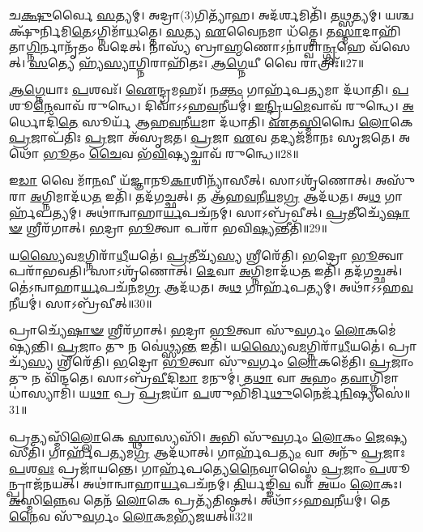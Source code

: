 𑌚\-\ul{𑌕𑍍𑌷𑍁}\-𑌰𑍍𑌵𑍈 \ul{𑌸}\-𑌤𑍍𑌯𑌮𑍍।
𑌅𑌦𑍍𑌰𑌾(3)𑌗𑌿𑌤𑍍𑌯𑌾᳴𑌹।
𑌅𑌦᳴𑌰𑍍\mbox{}\-\ul{𑌶}\-𑌮𑌿𑌤𑌿᳴।
𑌤\-\ul{𑌥𑍍𑌸}\-𑌤𑍍𑌯𑌮𑍍।
𑌯𑌶𑍍𑌚𑌕𑍍𑌷𑍁᳴𑌰𑍍𑌨𑌿𑌮𑌿\-\ul{𑌤𑍇}\-\-𑌽𑌗𑍍𑌨𑌿𑌮𑌾᳴\-\ul{𑌧}\-𑌤𑍍𑌤𑍇।
\-\ul{𑌸}\-𑌤𑍍𑌯 \ul{𑌏}\-𑌵𑍈\-\ul{𑌨}\-𑌮𑌾 𑌧᳴𑌤𑍍𑌤𑍇।
𑌤\-\ul{𑌸𑍍𑌮𑌾}\-𑌦𑌾𑌹𑌿᳴𑌤𑌾\-\ul{𑌗𑍍𑌨𑌿}\-𑌰𑍍𑌨𑌾𑌨𑍃᳴𑌤𑌂 𑌵𑌦𑍇𑌤𑍍।
𑌨𑌾𑌸𑍍𑌯᳴ 𑌬𑍍𑌰𑌾\-\ul{𑌹𑍍𑌮}\-𑌣𑍋\-𑌽𑌨𑌾॑𑌶𑍍𑌵𑌾\-\ul{𑌨𑍍𑌗𑍃}\-𑌹𑍇 𑌵᳴𑌸𑍇𑌤𑍍।
\-\ul{𑌸}\-𑌤𑍍𑌯𑍇 𑌹𑍍𑌯᳴\-\ul{𑌸𑍍𑌯𑌾}\-𑌗𑍍𑌨𑌿𑌰𑌾𑌹𑌿᳴𑌤𑌃।
\-\ul{𑌆}\-\-\ul{𑌗𑍍𑌨𑍇}\-𑌯𑍀 𑌵𑍈 𑌰𑌾𑌤𑍍𑌰𑌿𑌃᳴॥27॥

\-\ul{𑌆}\-\-\ul{𑌗𑍍𑌨𑍇}\-𑌯𑌾𑌃 \ul{𑌪}\-𑌶𑌵𑌃᳴।
\-\ul{𑌐}\-𑌨𑍍𑌦𑍍𑌰𑌮𑌹𑌃᳴।
𑌨\-\ul{𑌕𑍍𑌤𑌂} 𑌗𑌾𑌰𑍍\mbox{}𑌹᳴𑌪\-\ul{𑌤𑍍𑌯}\-𑌮𑌾 𑌦᳴𑌧𑌾𑌤𑌿।
\-\ul{𑌪}\-𑌶𑍂\-\ul{𑌨𑍇}\-𑌵𑌾𑌵᳴ 𑌰𑍁𑌨𑍍𑌧𑍇।
𑌦𑌿𑌵𑌾᳴𑌽𑌽𑌹\-\ul{𑌵}\-𑌨𑍀𑌯𑌮𑍍॑।
\-\ul{𑌇}\-\-\ul{𑌨𑍍𑌦𑍍𑌰𑌿}\-𑌯\-\ul{𑌮𑍇}\-𑌵𑌾𑌵᳴ 𑌰𑍁𑌨𑍍𑌧𑍇।
\-\ul{𑌅}\-𑌰𑍍𑌧𑍋𑌦𑌿᳴\-\ul{𑌤𑍇} 𑌸𑍂𑌰𑍍𑌯᳴ 𑌆𑌹\-\ul{𑌵}\-𑌨𑍀\-\ul{𑌯}\-𑌮𑌾 𑌦᳴𑌧𑌾𑌤𑌿।
\-\ul{𑌏}\-𑌤\-\ul{𑌸𑍍𑌮𑌿}\-𑌨𑍍𑌵𑍈 \ul{𑌲𑍋}\-𑌕𑍇 \ul{𑌪𑍍𑌰}\-𑌜𑌾\-𑌪᳴𑌤𑌿𑌃 \ul{𑌪𑍍𑌰}\-𑌜𑌾 𑌅᳴\-𑌸𑍃𑌜𑌤।
\-\ul{𑌪𑍍𑌰}\-𑌜𑌾 \ul{𑌏}\-𑌵 𑌤𑌦𑍍𑌯𑌜᳴𑌮𑌾𑌨𑌃 𑌸𑍃𑌜𑌤𑍇।
𑌅𑌥𑍋᳴ \ul{𑌭𑍂}\-𑌤𑌂 \ul{𑌚𑍈}\-𑌵 𑌭᳴\-\ul{𑌵𑌿}\-𑌷𑍍𑌯𑌚𑍍𑌚𑌾𑌵᳴ 𑌰𑍁𑌨𑍍𑌧𑍇॥28॥

𑌇\-\ul{𑌡𑌾} 𑌵𑍈 𑌮𑌾᳴\-\ul{𑌨}\-𑌵𑍀 𑌯᳴𑌜𑍍𑌞𑌾𑌨𑍂\-\ul{𑌕𑌾}\-𑌶𑌿𑌨𑍍𑌯𑌾᳴𑌸𑍀𑌤𑍍।
𑌸𑌾𑌽𑌶𑍃᳴𑌣𑍋𑌤𑍍।
𑌅𑌸𑍁᳴𑌰𑌾 \ul{𑌅}\-𑌗𑍍𑌨𑌿𑌮𑌾𑌦᳴𑌧\-\ul{𑌤} 𑌇𑌤𑌿᳴।
𑌤𑌦᳴𑌗𑌚𑍍𑌛𑌤𑍍।
𑌤 𑌆᳴𑌹\-\ul{𑌵}\-𑌨𑍀\-\ul{𑌯}\-𑌮\-\ul{𑌗𑍍𑌰} 𑌆𑌦᳴𑌧𑌤।
𑌅\-\ul{𑌥} 𑌗𑌾𑌰𑍍\mbox{}𑌹᳴𑌪𑌤𑍍𑌯𑌮𑍍।
𑌅𑌥𑌾॑𑌨𑍍𑌵𑌾𑌹𑌾\-\ul{𑌰𑍍𑌯}\-𑌪𑌚᳴𑌨𑌮𑍍।
𑌸𑌾𑌽𑌬𑍍𑌰᳴𑌵𑍀𑌤𑍍।
\-\ul{𑌪𑍍𑌰}\-𑌤𑍀𑌚𑍍𑌯𑍇᳴\-\ul{𑌷𑌾}\-\-\ul{𑍟} 𑌶𑍍𑌰𑍀𑌰᳴𑌗𑌾𑌤𑍍।
\-\ul{𑌭}\-𑌦𑍍𑌰𑌾 \ul{𑌭𑍂}\-𑌤𑍍𑌵𑌾 𑌪𑌰𑌾᳴ 𑌭𑌵𑌿\-\ul{𑌷𑍍𑌯}\-𑌨𑍍𑌤𑍀𑌤𑌿᳴॥29॥

𑌯\-\ul{𑌸𑍍𑌯𑍈}\-𑌵\-\ul{𑌮}\-𑌗𑍍𑌨𑌿𑌰𑌾᳴\-\ul{𑌧𑍀}\-𑌯𑌤𑍇॑।
\-\ul{𑌪𑍍𑌰}\-𑌤𑍀𑌚𑍍𑌯᳴\-\ul{𑌸𑍍𑌯} 𑌶𑍍𑌰𑍀𑌰𑍇᳴𑌤𑌿।
\-\ul{𑌭}\-𑌦𑍍𑌰𑍋 \ul{𑌭𑍂}\-𑌤𑍍𑌵𑌾 𑌪𑌰𑌾᳴𑌭𑌵𑌤𑌿।
𑌸𑌾𑌽𑌶𑍃᳴𑌣𑍋𑌤𑍍।
\-\ul{𑌦𑍇}\-𑌵𑌾 \ul{𑌅}\-𑌗𑍍𑌨𑌿𑌮𑌾𑌦᳴𑌧\-\ul{𑌤} 𑌇𑌤𑌿᳴।
𑌤𑌦᳴𑌗𑌚𑍍𑌛𑌤𑍍।
𑌤𑍇॑𑌽𑌨𑍍𑌵𑌾𑌹𑌾\-\ul{𑌰𑍍𑌯}\-𑌪𑌚᳴\-\ul{𑌨}\-𑌮\-\ul{𑌗𑍍𑌰} 𑌆𑌦᳴𑌧𑌤।
𑌅\-\ul{𑌥} 𑌗𑌾𑌰𑍍\mbox{}𑌹᳴𑌪𑌤𑍍𑌯𑌮𑍍।
𑌅𑌥𑌾᳴𑌽𑌽𑌹\-\ul{𑌵}\-𑌨𑍀\-𑌯𑌮𑍍॑।
𑌸𑌾𑌽𑌬𑍍𑌰᳴𑌵𑍀𑌤𑍍॥30॥

𑌪𑍍𑌰𑌾𑌚𑍍𑌯𑍇᳴\-\ul{𑌷𑌾}\-\-\ul{𑍟} 𑌶𑍍𑌰𑍀𑌰᳴𑌗𑌾𑌤𑍍।
\-\ul{𑌭}\-𑌦𑍍𑌰𑌾 \ul{𑌭𑍂}\-𑌤𑍍𑌵𑌾 𑌸𑍁᳴\-\ul{𑌵}\-𑌰𑍍𑌗𑌂 \ul{𑌲𑍋}\-𑌕𑌮𑍇॑𑌷𑍍𑌯𑌨𑍍𑌤𑌿।
\-\ul{𑌪𑍍𑌰}\-𑌜𑌾𑌂 𑌤𑍁 𑌨 𑌵𑍇॑𑌥𑍍𑌸𑍍𑌯\-\ul{𑌨𑍍𑌤} 𑌇𑌤𑌿᳴।
𑌯\-\ul{𑌸𑍍𑌯𑍈}\-𑌵\-\ul{𑌮}\-𑌗𑍍𑌨𑌿𑌰𑌾᳴\-\ul{𑌧𑍀}\-𑌯𑌤𑍇॑।
𑌪𑍍𑌰𑌾𑌚𑍍𑌯᳴\-\ul{𑌸𑍍𑌯} 𑌶𑍍𑌰𑍀𑌰𑍇᳴𑌤𑌿।
\-\ul{𑌭}\-𑌦𑍍𑌰𑍋 \ul{𑌭𑍂}\-𑌤𑍍𑌵𑌾 𑌸𑍁᳴\-\ul{𑌵}\-𑌰𑍍𑌗𑌂 \ul{𑌲𑍋}\-𑌕𑌮𑍇᳴𑌤𑌿।
\-\ul{𑌪𑍍𑌰}\-𑌜𑌾𑌂 𑌤𑍁 𑌨 𑌵𑌿᳴𑌨𑍍𑌦𑌤𑍇।
𑌸𑌾𑌽𑌬𑍍𑌰᳴\-\ul{𑌵𑍀}\-𑌦𑌿\-\ul{𑌡𑌾} 𑌮𑌨𑍁𑌮𑍍॑।
𑌤\-\ul{𑌥𑌾} 𑌵𑌾 \ul{𑌅}\-𑌹𑌂 𑌤\-\ul{𑌵𑌾}\-𑌗𑍍𑌨𑌿𑌮𑌾𑌧𑌾॑𑌸𑍍𑌯𑌾𑌮𑌿।
𑌯\-\ul{𑌥𑌾} 𑌪𑍍𑌰 \ul{𑌪𑍍𑌰}\-𑌜𑌯𑌾᳴ \ul{𑌪}\-𑌶𑍁𑌭𑌿᳴𑌰𑍍𑌮𑌿\-\ul{𑌥𑍁}\-𑌨𑍈𑌰𑍍𑌜᳴\-\ul{𑌨𑌿}\-𑌷𑍍𑌯𑌸𑍇॑॥31॥

𑌪𑍍𑌰\-\ul{𑌤𑍍𑌯}\-𑌸𑍍𑌮𑌿𑌁\-\ul{𑌲𑍍𑌲𑍋}\-𑌕𑍇 \ul{𑌸𑍍𑌥𑌾}\-𑌸𑍍𑌯𑌸𑌿᳴।
\-\ul{𑌅}\-𑌭𑌿 𑌸𑍁᳴\-\ul{𑌵}\-𑌰𑍍𑌗𑌂 \ul{𑌲𑍋}\-𑌕𑌂 \ul{𑌜𑍇}\-𑌷𑍍𑌯𑌸𑍀𑌤𑌿᳴।
𑌗𑌾𑌰𑍍\mbox{}𑌹᳴𑌪\-\ul{𑌤𑍍𑌯}\-𑌮\-\ul{𑌗𑍍𑌰} 𑌆𑌦᳴𑌧𑌾𑌤𑍍।
𑌗𑌾𑌰𑍍\mbox{}𑌹᳴𑌪\-\ul{𑌤𑍍𑌯𑌂} 𑌵𑌾 𑌅𑌨𑍁᳴ \ul{𑌪𑍍𑌰}\-𑌜𑌾𑌃 \ul{𑌪}\-𑌶\-\ul{𑌵𑌃} 𑌪𑍍𑌰𑌜𑌾᳴𑌯𑌨𑍍𑌤𑍇।
𑌗𑌾𑌰𑍍\mbox{}𑌹᳴𑌪𑌤𑍍𑌯𑍇\-\ul{𑌨𑍈}\-𑌵𑌾𑌸𑍍𑌮𑍈॑ \ul{𑌪𑍍𑌰}\-𑌜𑌾𑌂 \ul{𑌪}\-𑌶𑍂𑌨𑍍𑌪𑍍𑌰𑌾𑌜᳴𑌨𑌯𑌤𑍍।
𑌅𑌥𑌾॑𑌨𑍍𑌵𑌾𑌹𑌾\-\ul{𑌰𑍍𑌯}\-𑌪𑌚᳴𑌨𑌮𑍍।
\-\ul{𑌤𑌿}\-𑌰𑍍𑌯𑌙𑍍𑌙𑌿᳴\-\ul{𑌵} 𑌵𑌾 \ul{𑌅}\-𑌯𑌂 \ul{𑌲𑍋}\-𑌕𑌃।
\-\ul{𑌅}\-𑌸𑍍𑌮𑌿\-\ul{𑌨𑍍𑌨𑍇}\-𑌵 𑌤𑍇𑌨᳴ \ul{𑌲𑍋}\-𑌕𑍇 𑌪𑍍𑌰𑌤𑍍𑌯᳴𑌤𑌿𑌷𑍍𑌠𑌤𑍍।
𑌅𑌥𑌾᳴𑌽𑌽𑌹\-\ul{𑌵}\-𑌨𑍀𑌯𑌮𑍍॑।
𑌤𑍇\-\ul{𑌨𑍈}\-𑌵 𑌸𑍁᳴\-\ul{𑌵}\-𑌰𑍍𑌗𑌂 \ul{𑌲𑍋}\-𑌕\-\ul{𑌮}\-𑌭𑍍𑌯᳴𑌜𑌯𑌤𑍍॥32॥

